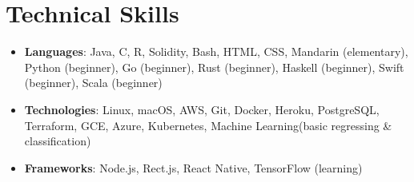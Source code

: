 \documentclass[letterpaper,11pt]{article}
\newcommand{\resumeSubHeadingListStart}{\begin{itemize}[leftmargin=*]}
\newcommand{\resumeSubHeadingListEnd}{\end{itemize}}
\begin{document}
\section{Technical Skills}
  \resumeSubHeadingListStart
    \item{
      \textbf{Languages}{: Java, C, R, Solidity, Bash, HTML, CSS, Mandarin (elementary), Python (beginner), Go (beginner), Rust (beginner), Haskell (beginner), Swift (beginner), Scala (beginner)}
    }
    \item{
      \textbf{Technologies}{: Linux, macOS, AWS, Git, Docker, Heroku, PostgreSQL, Terraform, GCE, Azure, Kubernetes, Machine Learning(basic regressing \& classification) }
    }
    \item{
      \textbf{Frameworks}{: Node.js, Rect.js, React Native, TensorFlow (learning) }
    }
  \resumeSubHeadingListEnd

\end{document}
